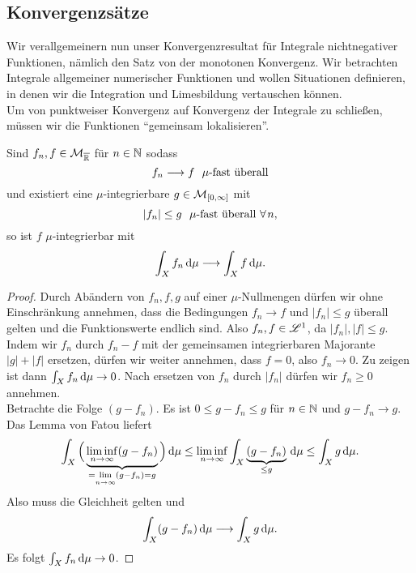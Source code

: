 \subsection{Konvergenzsätze}
Wir verallgemeinern nun unser Konvergenzresultat für Integrale nichtnegativer Funktionen, nämlich den Satz von der monotonen Konvergenz. Wir betrachten Integrale allgemeiner numerischer Funktionen und wollen Situationen definieren, in denen wir die Integration und Limesbildung vertauschen können. \vspace{0.5pc}\\
Um von punktweiser Konvergenz auf Konvergenz der Integrale zu schließen, müssen wir die Funktionen ``gemeinsam lokalisieren''.
\begin{satz}
\begin{mdframed}
Sind $f_n,f\in \mathcal{M}_{\overline{\mathbb{R}}}$ für $n\in\mathbb{N}$ sodass
$$f_n \longrightarrow f \ \ \mu\text{-fast überall}$$
und existiert eine $\mu$-integrierbare $g\in \mathcal{M}_{[0,\infty]}$ mit 
$$|f_n|\leq g \ \ \mu\te{-fast überall} \ \forall n,$$
so ist $f$ $\mu$-integrierbar mit
$$\int_X f_n \, \mathrm{d}\mu \longrightarrow \int_X f \, \mathrm{d} \mu.$$
\end{mdframed}
\begin{proof}
Durch Abändern von $f_n,f,g$ auf einer $\mu$-Nullmengen dürfen wir ohne Einschränkung annehmen, dass die Bedingungen $f_n \to f$ und $|f_n|\leq g$ überall gelten und die Funktionswerte endlich sind. Also $f_n,f\in \mathscr{L}^1$, da $|f_n|,|f|\leq g$. \vspace{0.5pc}\\
Indem wir $f_n$ durch $f_n -f$ mit der gemeinsamen integrierbaren Majorante $|g|+|f|$ ersetzen, dürfen wir weiter annehmen, dass $f=0$, also $f_n \to 0$. Zu zeigen ist dann $\int_X f_n \, \mathrm{d}\mu\to 0$. Nach ersetzen von $f_n$ durch $|f_n|$ dürfen wir $f_n\geq 0$ annehmen.\vspace{0.5pc}\\
Betrachte die Folge $(g-f_n)$. Es ist $0 \leq g-f_n \leq g$ für $n\in \mathbb{N}$ und $g-f_n \to g$. Das Lemma von Fatou liefert
\begin{equation*}
\begin{split}
\int_X\Big(\underbrace{\liminf_{n\to \infty}(g-f_n)}_{=\lim\limits_{n\to\infty}(g-f_n)=g}\Big)\, \mathrm{d} \mu \leq \liminf_{n\to\infty}\int_X \underbrace{(g-f_n)}_{\leq g}\, \mathrm{d}\mu \leq \int_X g \, \mathrm{d}\mu.
\end{split}
\end{equation*}
Also muss die Gleichheit gelten und
$$\int_X(g-f_n)\, \mathrm{d}\mu \longrightarrow \int_X g \, \mathrm{d}\mu. $$
Es folgt $\int_Xf_n\, \mathrm{d}\mu \to 0$.
\end{proof}
\end{satz}
